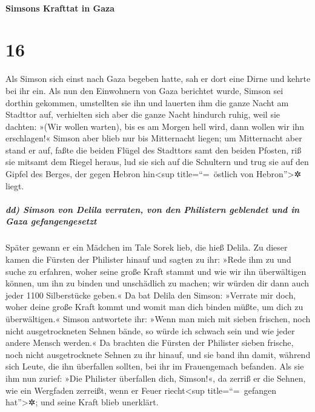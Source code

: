 \hypertarget{simsons-krafttat-in-gaza}{%
\paragraph{Simsons Krafttat in Gaza}\label{simsons-krafttat-in-gaza}}

\hypertarget{section-15}{%
\section{16}\label{section-15}}

Als Simson sich einst nach Gaza begeben hatte, sah er dort
eine Dirne und kehrte bei ihr ein. Als nun den Einwohnern
von Gaza berichtet wurde, Simson sei dorthin gekommen, umstellten sie
ihn und lauerten ihm die ganze Nacht am Stadttor auf, verhielten sich
aber die ganze Nacht hindurch ruhig, weil sie dachten: »(Wir wollen
warten), bis es am Morgen hell wird, dann wollen wir ihn erschlagen!«
Simson aber blieb nur bis Mitternacht liegen; um
Mitternacht aber stand er auf, faßte die beiden Flügel des Stadttors
samt den beiden Pfosten, riß sie mitsamt dem Riegel heraus, lud sie sich
auf die Schultern und trug sie auf den Gipfel des Berges, der gegen
Hebron hin\textless sup title=``=~östlich von Hebron''\textgreater✲
liegt.

\hypertarget{dd-simson-von-delila-verraten-von-den-philistern-geblendet-und-in-gaza-gefangengesetzt}{%
\subparagraph{dd) Simson von Delila verraten, von den Philistern
geblendet und in Gaza
gefangengesetzt}\label{dd-simson-von-delila-verraten-von-den-philistern-geblendet-und-in-gaza-gefangengesetzt}}

Später gewann er ein Mädchen im Tale Sorek lieb, die hieß
Delila. Zu dieser kamen die Fürsten der Philister hinauf
und sagten zu ihr: »Rede ihm zu und suche zu erfahren, woher seine große
Kraft stammt und wie wir ihn überwältigen können, um ihn zu binden und
unschädlich zu machen; wir würden dir dann auch jeder 1100 Silberstücke
geben.« Da bat Delila den Simson: »Verrate mir doch, woher
deine große Kraft kommt und womit man dich binden müßte, um dich zu
überwältigen.« Simson antwortete ihr: »Wenn man mich mit
sieben frischen, noch nicht ausgetrockneten Sehnen bände, so würde ich
schwach sein und wie jeder andere Mensch werden.« Da
brachten die Fürsten der Philister sieben frische, noch nicht
ausgetrocknete Sehnen zu ihr hinauf, und sie band ihn damit,
während sich Leute, die ihn überfallen sollten, bei ihr im
Frauengemach befanden. Als sie ihm nun zurief: »Die Philister überfallen
dich, Simson!«, da zerriß er die Sehnen, wie ein Wergfaden zerreißt,
wenn er Feuer riecht\textless sup title=``=~gefangen hat''\textgreater✲;
und seine Kraft blieb unerklärt.

